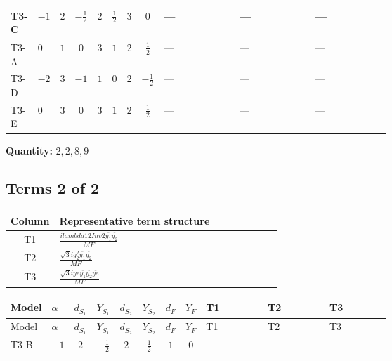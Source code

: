 \documentclass[8pt]{article}
\begin{document}
\begin{landscape}
\begin{longtable}{@{}llcccccc >{\raggedright\arraybackslash}p{0.21\linewidth} >{\raggedright\arraybackslash}p{0.21\linewidth} >{\raggedright\arraybackslash}p{0.21\linewidth}@{}}
\midrule
T3-C & $-1$ & $2$ & $-\frac{1}{2}$ & $2$ & $\frac{1}{2}$ & $3$ & $0$ & --- & --- & --- \\
\midrule
T3-A & $0$ & $1$ & $0$ & $3$ & $1$ & $2$ & $\frac{1}{2}$ & --- & --- & --- \\
\midrule
T3-D & $-2$ & $3$ & $-1$ & $1$ & $0$ & $2$ & $-\frac{1}{2}$ & --- & --- & --- \\
\midrule
T3-E & $0$ & $3$ & $0$ & $3$ & $1$ & $2$ & $\frac{1}{2}$ & --- & --- & --- \\
\midrule
\bottomrule
\end{longtable}
\clearpage
\noindent\textbf{Quantity: }$\mathrm{2,2,8,9}$\par\smallskip
\subsection*{Terms 2 of 2}
\begin{center}
\begin{tabular}{@{}c >{\raggedright\arraybackslash}p{0.82\linewidth}@{}}
\toprule
Column & Representative term structure \\
\midrule
T1 & \(\displaystyle \frac{i lambda12Inv2 \overline{y_{1}} \overline{y_{2}}}{MF}\) \\
\midrule
T2 & \(\displaystyle \frac{\sqrt{3} i g_{2}^{2} \overline{y_{1}} \overline{y_{2}}}{MF}\) \\
\midrule
T3 & \(\displaystyle \frac{\sqrt{3} i ye \overline{y_{1}} \overline{y_{2}} \overline{ye}}{MF}\) \\
\midrule
\bottomrule
\end{tabular}
\end{center}
\smallskip
\tiny
\begin{longtable}{@{}llcccccc >{\raggedright\arraybackslash}p{0.21\linewidth} >{\raggedright\arraybackslash}p{0.21\linewidth} >{\raggedright\arraybackslash}p{0.21\linewidth}@{}}
\toprule
Model & $\alpha$ & $d_{S_1}$ & $Y_{S_1}$ & $d_{S_2}$ & $Y_{S_2}$ & $d_F$ & $Y_F$ & T1 & T2 & T3 \\
\midrule
\endfirsthead
\toprule
Model & $\alpha$ & $d_{S_1}$ & $Y_{S_1}$ & $d_{S_2}$ & $Y_{S_2}$ & $d_F$ & $Y_F$ & T1 & T2 & T3 \\
\midrule
\endhead
T3-B & $-1$ & $2$ & $-\frac{1}{2}$ & $2$ & $\frac{1}{2}$ & $1$ & $0$ & --- & --- & --- \\
\midrule

\end{longtable}
\end{landscape}
\end{document}
